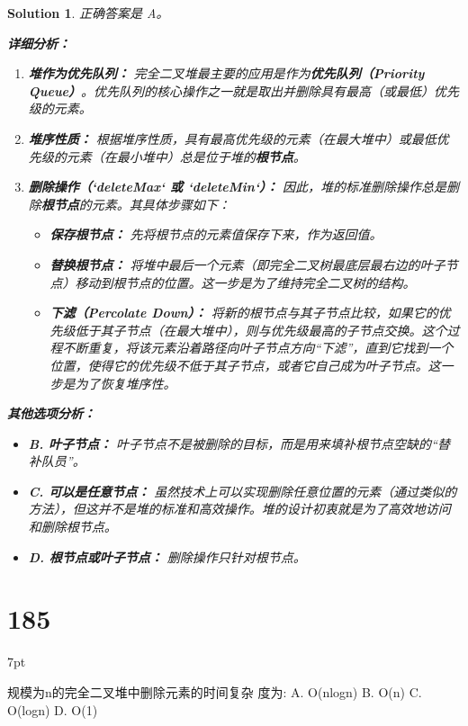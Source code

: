 \documentclass[UTF8]{report}
\newtheorem{solution}{Solution}
\theoremstyle{MyLineTheoremStyle} %
\theoremstyle{MyBlockTheoremStyle} %
\theoremstyle{MySubsubsectionStyle} %
\newenvironment{graybox}{%
        \def\FrameCommand{%
        \hspace{1pt}%
        {\color{gray}\small \vrule width 2pt}%
        {\color{graybox_color}\vrule width 4pt}%
        \colorbox{graybox_color}%
        }%
        \MakeFramed{\advance\hsize-\width\FrameRestore}%
        \noindent\hspace{-4.55pt}%
        \begin{adjustwidth}{}{7pt}%
        \vspace{2pt}\vspace{2pt}%
        }
        {%
        \vspace{2pt}\end{adjustwidth}\endMakeFramed%
        }
\begin{document}
\begin{solution}
正确答案是 A。

\textbf{详细分析：}

\begin{enumerate}
    \item \textbf{堆作为优先队列：}
    完全二叉堆最主要的应用是作为\textbf{优先队列（Priority Queue）}。优先队列的核心操作之一就是取出并删除具有最高（或最低）优先级的元素。

    \item \textbf{堆序性质：}
    根据堆序性质，具有最高优先级的元素（在最大堆中）或最低优先级的元素（在最小堆中）总是位于堆的\textbf{根节点}。

    \item \textbf{删除操作（`deleteMax` 或 `deleteMin`）：}
    因此，堆的标准删除操作总是删除\textbf{根节点}的元素。其具体步骤如下：
    \begin{itemize}
        \item \textbf{保存根节点：} 先将根节点的元素值保存下来，作为返回值。
        \item \textbf{替换根节点：} 将堆中最后一个元素（即完全二叉树最底层最右边的叶子节点）移动到根节点的位置。这一步是为了维持完全二叉树的结构。
        \item \textbf{下滤（Percolate Down）：} 将新的根节点与其子节点比较，如果它的优先级低于其子节点（在最大堆中），则与优先级最高的子节点交换。这个过程不断重复，将该元素沿着路径向叶子节点方向“下滤”，直到它找到一个位置，使得它的优先级不低于其子节点，或者它自己成为叶子节点。这一步是为了恢复堆序性。
    \end{itemize}
\end{enumerate}

\textbf{其他选项分析：}
\begin{itemize}
    \item \textbf{B. 叶子节点：} 叶子节点不是被删除的目标，而是用来填补根节点空缺的“替补队员”。
    \item \textbf{C. 可以是任意节点：} 虽然技术上可以实现删除任意位置的元素（通过类似的方法），但这并不是堆的标准和高效操作。堆的设计初衷就是为了高效地访问和删除根节点。
    \item \textbf{D. 根节点或叶子节点：} 删除操作只针对根节点。
\end{itemize}
\end{solution}

\section*{185}
\begin{graybox}
规模为n的完全二叉堆中删除元素的时间复杂
度为:
A. O(nlogn)
B. O(n)
C. O(logn)
D. O(1)
\end{graybox}
\end{document}
